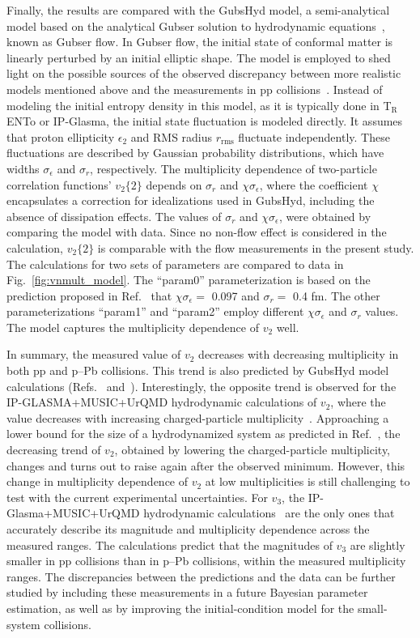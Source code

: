 Finally, the results are compared with the GubsHyd model, a semi-analytical model based on the analytical Gubser solution to hydrodynamic equations~\cite{Gubser:2010ze,Gubser:2010ui}, known as Gubser flow. In Gubser flow, the initial state of conformal matter is linearly perturbed by an initial elliptic shape. The model is employed to shed light on the possible sources of the observed discrepancy between more realistic models mentioned above and the measurements in pp collisions~\cite{Taghavi:2019mqz}. Instead of modeling the initial entropy density in this model, as it is typically done in T$_{\text{R}}$ENTo or IP-Glasma, the initial state fluctuation is modeled directly. It assumes that proton ellipticity $\epsilon_{2}$ and RMS radius $r_{\text{rms}}$ fluctuate independently. These fluctuations are described by Gaussian probability distributions, which have widths $\sigma_{\epsilon}$
 and $\sigma_{r}$, respectively. The multiplicity dependence of two-particle correlation functions' $v_2\{2\}$ depends on $\sigma_{r}$ and  $\chi\sigma_{\epsilon}$, where the coefficient $\chi$ encapsulates a correction for idealizations used in GubsHyd, including the absence of dissipation effects. The values of $\sigma_{r}$ and  $\chi\sigma_{\epsilon}$, were obtained by comparing the model with data. Since no non-flow effect is considered in the calculation, $v_2\{2\}$ is comparable with the flow measurements in the present study. The calculations for two sets of parameters are compared
to data in Fig.~\ref{fig:vnmult_model}. The “param0” parameterization is based on the prediction proposed in Ref.~\cite{Taghavi:2019mqz} that $\chi \sigma_{\epsilon} =$ 0.097 and $\sigma_{r} =$ 0.4 fm. The other parameterizations “param1” and “param2” employ different $\chi \sigma_{\epsilon}$  and $\sigma_{r}$ values. The model captures the multiplicity dependence of $v_2$ well.

In summary, the measured value of $v_{2}$ decreases with decreasing multiplicity in both pp and p--Pb collisions. This trend is also predicted by GubsHyd model calculations (Refs.~\cite{Taghavi:2019mqz} and~\cite{Weller:2017tsr}). Interestingly, the opposite trend is observed for the IP-GLASMA+MUSIC+UrQMD hydrodynamic calculations of $v_2$, where the value decreases with increasing charged-particle multiplicity~\cite{Schenke:2020mbo}.
Approaching a lower bound for the size of a hydrodynamized
system as predicted in Ref.~\cite{Taghavi:2019mqz}, 
the decreasing trend of $v_2$, obtained by lowering the charged-particle multiplicity, changes and turns out to raise again after the observed minimum. However, this change in multiplicity dependence of $v_2$ at low multiplicities is still challenging to test with the current experimental uncertainties. For $v_3$, the IP-Glasma+MUSIC+UrQMD hydrodynamic calculations~\cite{Schenke:2020mbo} are the only ones that accurately describe its magnitude and multiplicity dependence across the measured ranges. The calculations predict that the magnitudes of $v_3$ are slightly smaller in pp collisions than in p--Pb collisions, within the measured multiplicity ranges. The discrepancies between the predictions and the data can be further studied by including these measurements in a future Bayesian parameter estimation, as well as by improving the initial-condition model for the small-system collisions.
